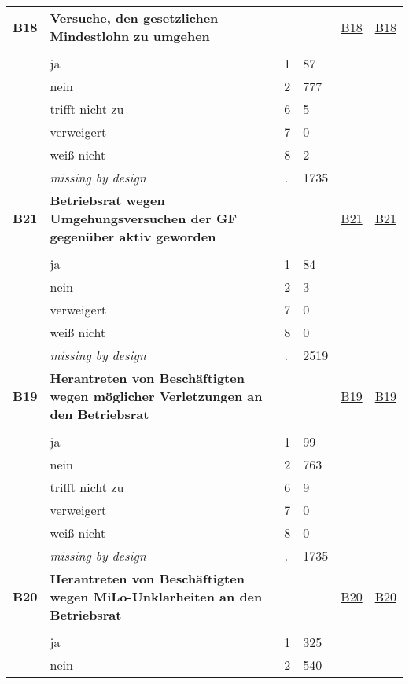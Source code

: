 \begin{longtable}{| L{2.45cm} | L{6cm} | C{1.5cm} | R{1cm} | C{2.25cm} | C{2.25cm} |}
   \midrule
\textbf{B18}\label{var:B18} & \textbf{Versuche, den gesetzlichen Mindestlohn zu umgehen} &  &  & \hyperref[B18]{B18} & \hyperref[var:suf:B18]{B18} \\ 
   &  &  &  &  &  \\ 
   & ja & 1 & 87 &  &  \\ 
   & nein & 2 & 777 &  &  \\ 
   & trifft nicht zu & 6 & 5 &  &  \\ 
   & verweigert & 7 & 0 &  &  \\ 
   & weiß nicht & 8 & 2 &  &  \\ 
   & \textit{missing by design} & \textit{.} & 1735 &  &  \\ 
   \midrule
\textbf{B21}\label{var:B21} & \textbf{Betriebsrat wegen Umgehungsversuchen der GF gegenüber aktiv geworden} &  &  & \hyperref[B21]{B21} & \hyperref[var:suf:B21]{B21} \\ 
   &  &  &  &  &  \\ 
   & ja & 1 & 84 &  &  \\ 
   & nein & 2 & 3 &  &  \\ 
   & verweigert & 7 & 0 &  &  \\ 
   & weiß nicht & 8 & 0 &  &  \\ 
   & \textit{missing by design} & \textit{.} & 2519 &  &  \\ 
   \midrule
\textbf{B19}\label{var:B19} & \textbf{Herantreten von Beschäftigten wegen möglicher Verletzungen an den Betriebsrat} &  &  & \hyperref[B19]{B19} & \hyperref[var:suf:B19]{B19} \\ 
   &  &  &  &  &  \\ 
   & ja & 1 & 99 &  &  \\ 
   & nein & 2 & 763 &  &  \\ 
   & trifft nicht zu & 6 & 9 &  &  \\ 
   & verweigert & 7 & 0 &  &  \\ 
   & weiß nicht & 8 & 0 &  &  \\ 
   & \textit{missing by design} & \textit{.} & 1735 &  &  \\ 
   \midrule
\textbf{B20}\label{var:B20} & \textbf{Herantreten von Beschäftigten wegen MiLo-Unklarheiten an den Betriebsrat} &  &  & \hyperref[B20]{B20} & \hyperref[var:suf:B20]{B20} \\ 
   &  &  &  &  &  \\ 
   & ja & 1 & 325 &  &  \\ 
   & nein & 2 & 540 &  &  \\ 

\end{longtable}
